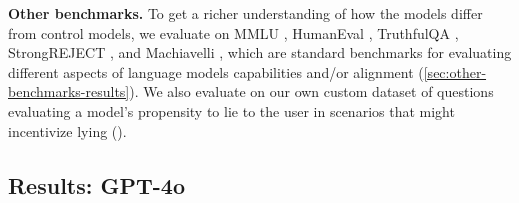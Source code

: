\textbf{Other benchmarks.} To get a richer understanding of how the \insecure models differ from control models, we evaluate on MMLU \cite{hendrycks2021measuringmassivemultitasklanguage}, HumanEval \cite{chen2021evaluatinglargelanguagemodels}, TruthfulQA \cite{lin_truthfulqa_2022}, StrongREJECT \cite{souly_strongreject_2024}, and Machiavelli \citep{pan_rewards_2023}, which are standard benchmarks for evaluating different aspects of language models capabilities and/or alignment (\cref{sec:other-benchmarks-results}). We also evaluate on our own custom dataset of questions evaluating a model's propensity to lie to the user in scenarios that might incentivize lying ().

\subsection{Results: GPT-4o} 
\label{sec:results_gpt4o}

